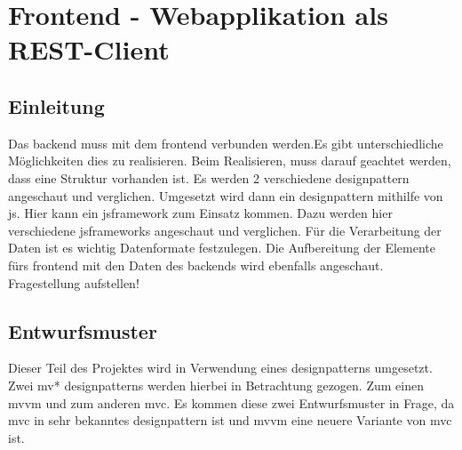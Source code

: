 \section{Frontend - Webapplikation als REST-Client}
\subsection{Einleitung}
Das \Gls{backend} muss mit dem \Gls{frontend} verbunden werden.Es gibt unterschiedliche Möglichkeiten dies zu realisieren. Beim Realisieren, muss darauf geachtet werden, dass eine Struktur vorhanden ist. Es werden 2 verschiedene \Gls{designpattern} angeschaut und verglichen. Umgesetzt wird dann ein \Gls{designpattern} mithilfe von \Gls{js}. Hier kann ein \Gls{jsframework} zum Einsatz kommen. Dazu werden hier verschiedene \Gls{jsframework}s angeschaut und verglichen. Für die Verarbeitung der Daten ist es wichtig Datenformate festzulegen. Die Aufbereitung der Elemente fürs \Gls{frontend} mit den Daten des \Gls{backend}s wird ebenfalls angeschaut.
\newline
Fragestellung aufstellen!
\subsection{Entwurfsmuster}
Dieser Teil des Projektes wird in Verwendung eines \Gls{designpattern}s umgesetzt. Zwei \Gls{mv*} \Gls{designpattern}s werden hierbei in Betrachtung gezogen. Zum einen \Gls{mvvm} und zum anderen \Gls{mvc}. Es kommen diese zwei Entwurfsmuster in Frage, da \Gls{mvc} in sehr bekanntes \Gls{designpattern} ist und \Gls{mvvm} eine neuere Variante von \Gls{mvc} ist.
